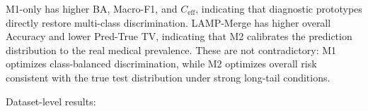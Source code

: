 \documentclass[letterpaper]{article}
\begin{document}
M1-only has higher BA, Macro-F1, and $C_{\mathrm{eff}}$, indicating that diagnostic prototypes directly restore multi-class discrimination. LAMP-Merge has higher overall Accuracy and lower Pred-True TV, indicating that M2 calibrates the prediction distribution to the real medical prevalence. These are not contradictory: M1 optimizes class-balanced discrimination, while M2 optimizes overall risk consistent with the true test distribution under strong long-tail conditions.


Dataset-level results:
\end{document}
